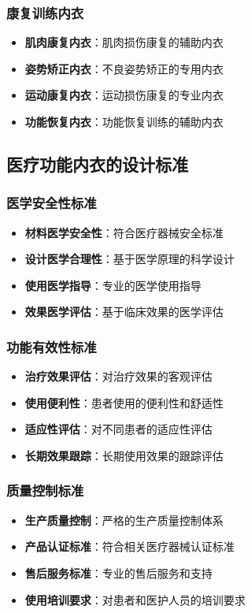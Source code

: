 \documentclass[12pt,UTF8]{ctexbook}
\begin{document}
\subsubsection{康复训练内衣}
\begin{itemize}[leftmargin=2cm]
	\item \textbf{肌肉康复内衣}：肌肉损伤康复的辅助内衣
	\item \textbf{姿势矫正内衣}：不良姿势矫正的专用内衣
	\item \textbf{运动康复内衣}：运动损伤康复的专业内衣
	\item \textbf{功能恢复内衣}：功能恢复训练的辅助内衣
\end{itemize}

\subsection{医疗功能内衣的设计标准}
\subsubsection{医学安全性标准}
\begin{itemize}[leftmargin=2cm]
	\item \textbf{材料医学安全性}：符合医疗器械安全标准
	\item \textbf{设计医学合理性}：基于医学原理的科学设计
	\item \textbf{使用医学指导}：专业的医学使用指导
	\item \textbf{效果医学评估}：基于临床效果的医学评估
\end{itemize}

\subsubsection{功能有效性标准}
\begin{itemize}[leftmargin=2cm]
	\item \textbf{治疗效果评估}：对治疗效果的客观评估
	\item \textbf{使用便利性}：患者使用的便利性和舒适性
	\item \textbf{适应性评估}：对不同患者的适应性评估
	\item \textbf{长期效果跟踪}：长期使用效果的跟踪评估
\end{itemize}

\subsubsection{质量控制标准}
\begin{itemize}[leftmargin=2cm]
	\item \textbf{生产质量控制}：严格的生产质量控制体系
	\item \textbf{产品认证标准}：符合相关医疗器械认证标准
	\item \textbf{售后服务标准}：专业的售后服务和支持
	\item \textbf{使用培训要求}：对患者和医护人员的培训要求
\end{itemize}
\end{document}

